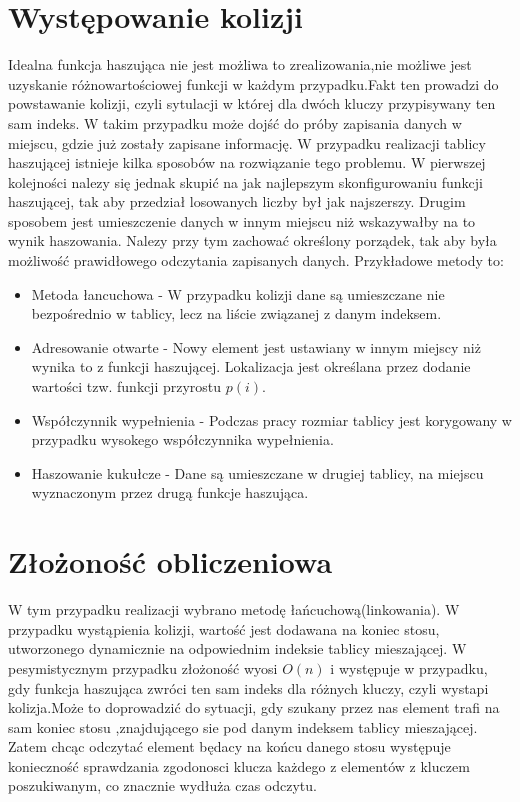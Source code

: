\documentclass[12pt,a4paper,titlepage]{article}
\begin{document}
\section{Występowanie kolizji}
Idealna funkcja haszująca nie jest możliwa to zrealizowania,nie możliwe jest uzyskanie różnowartościowej funkcji w każdym przypadku.Fakt ten prowadzi do powstawanie kolizji, czyli sytulacji w której dla dwóch kluczy przypisywany ten sam indeks.
W takim przypadku może dojść do próby zapisania danych w miejscu, gdzie już zostały zapisane informację.
W przypadku realizacji tablicy haszującej istnieje kilka sposobów na rozwiązanie tego problemu.
W pierwszej kolejności nalezy się jednak skupić na jak najlepszym skonfigurowaniu funkcji haszującej, tak aby przedział losowanych liczby był jak najszerszy. Drugim sposobem jest umieszczenie danych w innym miejscu niż wskazywałby na to wynik haszowania.
Nalezy przy tym zachować określony porządek, tak aby była możliwość prawidłowego odczytania zapisanych danych.
Przykładowe metody to:
\begin{itemize}
\item Metoda łancuchowa - W przypadku kolizji dane są umieszczane nie bezpośrednio w tablicy, lecz na liście związanej z danym indeksem.
\item Adresowanie otwarte - Nowy element jest ustawiany w innym miejscy niż wynika to z funkcji haszującej.
Lokalizacja jest określana przez dodanie wartości tzw. funkcji przyrostu $p(i)$.
\item Współczynnik wypełnienia - Podczas pracy rozmiar tablicy jest  korygowany w przypadku wysokego współczynnika wypełnienia.
\item Haszowanie kukułcze - Dane są umieszczane  w drugiej tablicy, na miejscu wyznaczonym przez drugą funkcje haszująca.
\end{itemize}
\section{Złożoność obliczeniowa}
W tym przypadku realizacji wybrano metodę łańcuchową(linkowania).
W przypadku wystąpienia kolizji, wartość jest dodawana na koniec stosu, utworzonego dynamicznie na odpowiednim indeksie tablicy mieszającej.
W pesymistycznym przypadku złożoność wyosi $O(n)$ i występuje w przypadku, gdy funkcja haszująca zwróci ten sam indeks dla różnych kluczy, czyli wystapi kolizja.Może to doprowadzić do sytuacji, gdy szukany przez nas element trafi na sam koniec stosu ,znajdującego sie pod danym indeksem tablicy mieszającej.
Zatem chcąc odczytać element będacy na końcu danego stosu występuje konieczność sprawdzania zgodonosci klucza każdego z elementów z kluczem poszukiwanym, co znacznie wydłuża czas odczytu.
\end{document}
